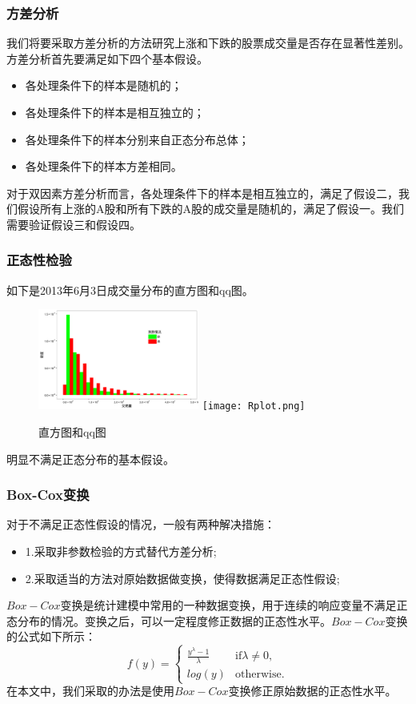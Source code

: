 \documentclass[9pt]{beamer}
\begin{document}
\begin{frame}
\frametitle{方差分析}
我们将要采取方差分析的方法研究上涨和下跌的股票成交量是否存在显著性差别。方差分析首先要满足如下四个基本假设。
\begin{itemize}
\item 各处理条件下的样本是随机的；
\item 各处理条件下的样本是相互独立的；
\item 各处理条件下的样本分别来自正态分布总体；
\item 各处理条件下的样本方差相同。
\end{itemize}
对于双因素方差分析而言，各处理条件下的样本是相互独立的，满足了假设二，我们假设所有上涨的A股和所有下跌的A股的成交量是随机的，满足了假设一。我们需要验证假设三和假设四。
\end{frame}

\begin{frame}
\frametitle{正态性检验}
如下是2013年6月3日成交量分布的直方图和qq图。
\begin{figure}[H]
\centering
\includegraphics[width=150pt]{直方图1.pdf}
\texttt{[image: Rplot.png]}
\caption{直方图和qq图}
\end{figure}
明显不满足正态分布的基本假设。
\end{frame}

\begin{frame}
\frametitle{Box-Cox变换}
对于不满足正态性假设的情况，一般有两种解决措施：
\begin{itemize}
\item 1.采取非参数检验的方式替代方差分析;
\item 2.采取适当的方法对原始数据做变换，使得数据满足正态性假设;
\end{itemize}
$Box-Cox$变换是统计建模中常用的一种数据变换，用于连续的响应变量不满足正态分布的情况。变换之后，可以一定程度修正数据的正态性水平。$Box-Cox$变换的公式如下所示：
\[ f(y)=\left\{ \begin{array}{ll}
\frac{y^{\lambda}-1}{\lambda} & \mbox{if}\lambda \neq 0,\\
log(y) & \mbox{otherwise.} \end{array} \right. \]
在本文中，我们采取的办法是使用$Box-Cox$变换修正原始数据的正态性水平。
\end{frame}
\end{document}
